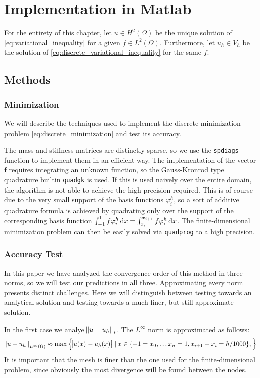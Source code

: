 \documentclass[headsepline,footsepline,footinclude=false,oneside,fontsize=11pt,paper=a4,listof=totoc,bibliography=totoc]{scrbook} %
\begin{document}
\chapter{Implementation in Matlab}
For the entirety of this chapter, let $u \in H^2(\Omega)$ be the unique solution of \eqref{eq:variational_inequality} for a given $f \in L^2(\Omega)$. Furthermore, let $u_h \in V_h$ be the solution of \eqref{eq:discrete_variational_inequality} for the same $f$.

\section{Methods}
\subsection{Minimization}
We will describe the techniques used to implement the discrete minimization problem \eqref{eq:discrete_minimization} and test its accuracy.

The mass and stiffness matrices are distinctly sparse, so we use the \verb|spdiags| function to implement them in an efficient way. 
The implementation of the vector $\mathbf{f}$ requires integrating an unknown function, so the Gauss-Kronrod type quadrature builtin \verb|quadgk| is used. If this is used naively over the entire domain, the algorithm is not able to achieve the high precision required. This is of course due to the very small support of the basis functions $\varphi_i^h$, so a sort of additive quadrature formula is achieved by quadrating only over the support of the corresponding basis function $\int_{-1}^1 f\varphi_i^h\dif x = \int_{x_i}^{x_{i+1}} f\varphi_i^h\dif x$.
The finite-dimensional minimization problem can then be easily solved via \verb|quadprog| to a high precision.

\subsection{Accuracy Test}

In this paper we have analyzed the convergence order of this method in three norms, so we will test our predictions in all three. Approximating every norm presents distinct challenges. Here we will distinguish between testing towards an analytical solution and testing towards a much finer, but still approximate solution.

In the first case we analye $\norm{u-u_h}_*$. The $L^\infty$ norm is approximated as follows:
\begin{equation*}
	\norm{u-u_h}_{L^\infty(\Omega)} \approx \max \left\{\abs{u(x) - u_h(x)} \,|\, x \in \{-1 = x_0,\dots x_n = 1, x_{i+1} - x_i = h/1000\}, \right\}
\end{equation*}
It is important that the mesh is finer than the one used for the finite-dimensional problem, since obviously the most divergence will be found between the nodes.
\end{document}
